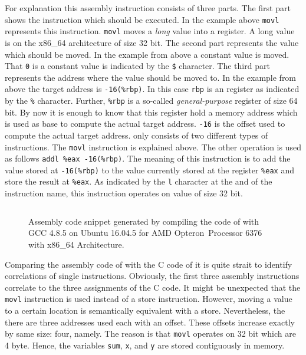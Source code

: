 \documentclass[onecolumn, openright, master, english, signatures]{dbrgrptt}
\begin{document}
For explanation this assembly instruction consists of three parts. The first part shows the instruction which should be executed. In the example above \texttt{movl} represents this instruction. \texttt{movl} moves a \emph{long} value into a register. A long value is on the x86\_64 architecture of size 32 bit. The second part represents the value which should be moved. In the example from above a constant value is moved. That \texttt{0} is a constant value is indicated by the \texttt{\$} character. The third part represents the address where the value should be moved to. In the example from above the target address is \texttt{-16(\%rbp)}. In this case \texttt{rbp} is an register as indicated by the \texttt{\%} character. Further, \texttt{\%rbp} is a so-called \emph{general-purpose} register of size 64 bit. By now it is enough to know that this register hold a memory address which is used as base to compute the actual target address. \texttt{-16} is the offset used to compute the actual target address.
 only consists of two different types of instructions. The \texttt{movl} instruction is explained above. The other operation is used as follows \texttt{addl \%eax -16(\%rbp)}. The meaning of this instruction is to add the value stored at \texttt{-16(\%rbp)} to the value currently stored at the register \texttt{\%eax} and store the result at \texttt{\%eax}. As indicated by the \texttt{l} character at the and of the instruction name, this instruction operates on value of size 32 bit.

\begin{figure}[!ht]
  \centering
  \begin{tabular}{c}
  
  \end{tabular}
  \caption{Assembly code snippet generated by compiling the code of  with GCC 4.8.5 on Ubuntu 16.04.5 for AMD Opteron\texttrademark~Processor 6376 with x86\_64 Architecture.}
  \label{fig:mat-example-assembly-code}
\end{figure}

Comparing the assembly code of  with the C code of  it is quite strait to identify correlations of single instructions. Obviously, the first three assembly instructions correlate to the three assignments of the C code. It might be unexpected that the \texttt{movl} instruction is used instead of a store instruction. However, moving a value to a certain location is semantically equivalent with a store. Nevertheless, the there are three addresses used each with an offset. These offsets increase exactly by same size: four, namely. The reason is that \texttt{movl} operates on 32 bit which are 4 byte. Hence, the variables \texttt{sum}, \texttt{x}, and \texttt{y} are stored contiguously in memory.
\end{document}
